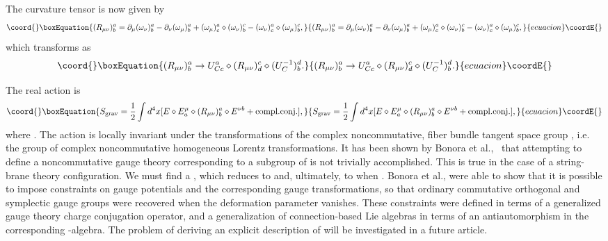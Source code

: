 \documentclass[a4paper,10pt]{article}
\begin{document}
The curvature tensor is now given by
\begin{equation}\coord{}\boxEquation{
(R_{\mu\nu})^a_b=\partial_\mu(\omega_\nu)^a_b-\partial_\nu(\omega_\mu)^a_b
+(\omega_\mu)^a_c\diamond(\omega_\nu)^c_b-(\omega_\nu)^a_c\diamond
(\omega_\mu)^c_b,
}{
(R_{\mu\nu})^a_b=\partial_\mu(\omega_\nu)^a_b-\partial_\nu(\omega_\mu)^a_b
+(\omega_\mu)^a_c\diamond(\omega_\nu)^c_b-(\omega_\nu)^a_c\diamond
(\omega_\mu)^c_b,
}{ecuacion}\coordE{}\end{equation}
which transforms as
\begin{equation}\coord{}\boxEquation{
(R_{\mu\nu})^a_b\rightarrow
U^a_{Cc}\diamond(R_{\mu\nu})^c_d\diamond(U_C^{-1})^d_b.
}{
(R_{\mu\nu})^a_b\rightarrow
U^a_{Cc}\diamond(R_{\mu\nu})^c_d\diamond(U_C^{-1})^d_b.
}{ecuacion}\coordE{}\end{equation}

The real action is
\begin{equation}\coord{}\boxEquation{
S_{\rm grav}=\frac{1}{2}\int d^4x[E\diamond E^\mu_a\diamond
(R_{\mu\nu})^a_b\diamond E^{\nu b} + {\rm compl. conj.}],
}{
S_{\rm grav}=\frac{1}{2}\int d^4x[E\diamond E^\mu_a\diamond
(R_{\mu\nu})^a_b\diamond E^{\nu b} + {\rm compl. conj.}],
}{ecuacion}\coordE{}\end{equation}
where \coordHE{}.  The action \coordHE{} is locally invariant under the
transformations of the complex noncommutative, fiber bundle tangent space
group \coordHE{}, i.e. the group of complex noncommutative homogeneous
Lorentz transformations. It has been shown by Bonora et al.,~\cite{Bonora}
that attempting to define a noncommutative gauge theory corresponding to a
subgroup of \coordHE{} is not trivially accomplished. This is
true in the case of a string-brane theory configuration. We must find a
\coordHE{}, which reduces to \coordHE{} and, ultimately, to \coordHE{}
when \coordHE{}. Bonora et al., were able to show that it is
possible to impose constraints on gauge potentials and the corresponding
gauge transformations, so that ordinary commutative orthogonal and
symplectic gauge groups were recovered when the deformation parameter
\myHighlight{$\theta$}\coordHE{} vanishes. These constraints were defined in terms of a generalized
gauge theory charge conjugation operator, and a generalization of
connection-based Lie algebras in terms of an antiautomorphism in the
corresponding \coordHE{}-algebra. The problem of deriving an
explicit description of \coordHE{} will be investigated in a future
article.
\end{document}
